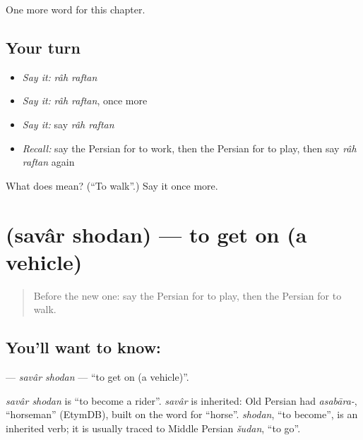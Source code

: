 \begin{grammarlens}[title={What you've built}]
One more word for this chapter.
\end{grammarlens}

\subsection*{Your turn}
\begin{itemize}
\raggedright
  \item \emph{Say it:} \emph{râh raftan}
  \item \emph{Say it:} \emph{râh raftan}, once more
  \item \emph{Say it:} say \emph{râh raftan}
  \item \emph{Recall:} say the Persian for to work, then the Persian for to play, then say \emph{râh raftan} again
\end{itemize}

\begin{tcolorbox}[breakable,colback=teal!4,colframe=teal!35!black,title={Before you move on}]
What does   mean? (\textquotedblleft{}To walk\textquotedblright{}.) Say it once more.
\end{tcolorbox}
\section[\texorpdfstring{\fa{سوار} \fa{شدن} (savâr shodan)}{سوار شدن (savâr shodan)}]{  (savâr shodan) — to get on (a vehicle)}

\label{lesson:FA-C217-savar-shodan}



\begin{quote}
Before the new one: say the Persian for to play, then the Persian for to walk.
\end{quote}

\subsection*{You'll want to know:  }
\textbf{ } — \emph{savâr shodan} — \textquotedblleft{}to get on (a vehicle)\textquotedblright{}.

\begin{cousinweb}
\emph{savâr shodan} is \textquotedblleft{}to become a rider\textquotedblright{}. \emph{savâr} is inherited: Old Persian had \emph{asabāra-}, \textquotedblleft{}horseman\textquotedblright{} (EtymDB), built on the word for \textquotedblleft{}horse\textquotedblright{}. \emph{shodan}, \textquotedblleft{}to become\textquotedblright{}, is an inherited verb; it is usually traced to Middle Persian \emph{šudan}, \textquotedblleft{}to go\textquotedblright{}.
\end{cousinweb}

